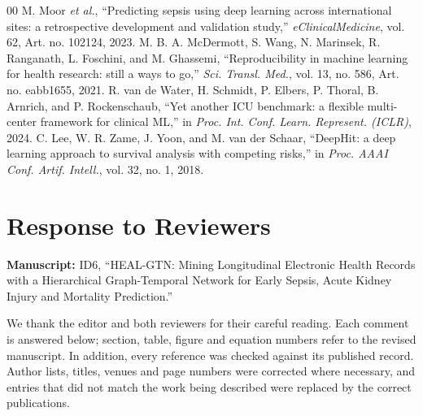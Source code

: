 \documentclass[conference]{IEEEtran}
\begin{document}
\begin{thebibliography}{00}
 M. Moor \textit{et al.}, ``Predicting sepsis using deep learning across international sites: a retrospective development and validation study,'' \textit{eClinicalMedicine}, vol. 62, Art. no. 102124, 2023.
 M. B. A. McDermott, S. Wang, N. Marinsek, R. Ranganath, L. Foschini, and M. Ghassemi, ``Reproducibility in machine learning for health research: still a ways to go,'' \textit{Sci. Transl. Med.}, vol. 13, no. 586, Art. no. eabb1655, 2021.
 R. van de Water, H. Schmidt, P. Elbers, P. Thoral, B. Arnrich, and P. Rockenschaub, ``Yet another ICU benchmark: a flexible multi-center framework for clinical ML,'' in \textit{Proc. Int. Conf. Learn. Represent. (ICLR)}, 2024.
 C. Lee, W. R. Zame, J. Yoon, and M. van der Schaar, ``DeepHit: a deep learning approach to survival analysis with competing risks,'' in \textit{Proc. AAAI Conf. Artif. Intell.}, vol. 32, no. 1, 2018.
\end{thebibliography}

\clearpage
\onecolumn
\section*{Response to Reviewers}
\noindent\textbf{Manuscript:} ID6, ``HEAL-GTN: Mining Longitudinal Electronic Health Records with a Hierarchical Graph-Temporal Network for Early Sepsis, Acute Kidney Injury and Mortality Prediction.''

\medskip
\noindent We thank the editor and both reviewers for their careful reading. Each comment is answered below; section, table, figure and equation numbers refer to the revised manuscript. In addition, every reference was checked against its published record. Author lists, titles, venues and page numbers were corrected where necessary, and entries that did not match the work being described were replaced by the correct publications.
\end{document}
